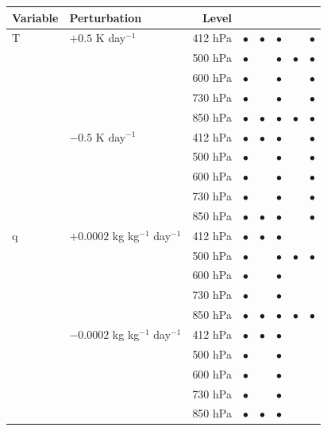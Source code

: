 \documentclass[draft]{agujournal2019}
\begin{document}
{\begin{table}
\begin{tabular}{llrccccc}
        \textbf{Variable} & \textbf{Perturbation} & \textbf{Level} & & & & & \\
        \hline
        T & $+0.5$ K day$^{-1}$ & 412 hPa & $\bullet{}$ & $\bullet{}$ & $\bullet{}$ &  & $\bullet{}$ \\
        & & 500 hPa & $\bullet{}$ & & $\bullet{}$ & $\bullet{}$ & $\bullet{}$ \\
        & & 600 hPa & $\bullet{}$ & & $\bullet{}$ &  & $\bullet{}$ \\
        & & 730 hPa & $\bullet{}$ & & $\bullet{}$ &  & $\bullet{}$ \\
        & & 850 hPa & $\bullet{}$ & $\bullet{}$ & $\bullet{}$ & $\bullet{}$ & $\bullet{}$ \\
        & $-0.5$ K day$^{-1}$ & 412 hPa & $\bullet{}$ & $\bullet{}$ & $\bullet{}$ &  & $\bullet{}$ \\
        & & 500 hPa & $\bullet{}$ & & $\bullet{}$ &  & $\bullet{}$\\
        & & 600 hPa & $\bullet{}$ & & $\bullet{}$ &  & $\bullet{}$ \\
        & & 730 hPa & $\bullet{}$ & & $\bullet{}$ &  & $\bullet{}$ \\
        & & 850 hPa & $\bullet{}$ & $\bullet{}$ & $\bullet{}$ &  & $\bullet{}$ \\
        \hline
        q & $+0.0002$ kg kg$^{-1}$ day$^{-1}$ & 412 hPa & $\bullet{}$ & $\bullet{}$ & $\bullet{}$ &  &  \\
        & & 500 hPa & $\bullet{}$ & & $\bullet{}$ & $\bullet{}$ & $\bullet{}$ \\
        & & 600 hPa & $\bullet{}$ & & $\bullet{}$ &  &  \\
        & & 730 hPa & $\bullet{}$ & & $\bullet{}$ &  &  \\
        & & 850 hPa & $\bullet{}$ & $\bullet{}$ & $\bullet{}$ & $\bullet{}$ & $\bullet{}$ \\
        & $-0.0002$ kg kg$^{-1}$ day$^{-1}$& 412 hPa & $\bullet{}$ & $\bullet{}$ & $\bullet{}$ &  &  \\
        & & 500 hPa & $\bullet{}$ & & $\bullet{}$ &  &  \\
        & & 600 hPa & $\bullet{}$ & & $\bullet{}$ &  &  \\
        & & 730 hPa & $\bullet{}$ & & $\bullet{}$ &  &  \\
        & & 850 hPa & $\bullet{}$ & $\bullet{}$ & $\bullet{}$ &  &  \\
        \hline
    \end{tabular}
\end{table}
}
\end{document}
